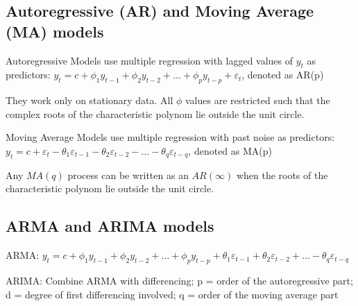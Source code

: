 \subsection{Autoregressive (AR) and Moving Average (MA) models}
Autoregressive Models use multiple regression with lagged values of $ y_t $ as predictors:
$ y_t = c + \phi_1 y_{t-1} + \phi_2 y_{t-2} + \ldots + \phi_p y_{t-p} + \varepsilon_t $, denoted as AR(p)

They work only on stationary data. All $ \phi $ values are restricted such that the complex roots of the characteristic polynom lie outside the unit circle.

Moving Average Models use multiple regression with past noise as predictors:
$ y_t = c + \varepsilon_t - \theta_1 \varepsilon_{t-1} - \theta_2 \varepsilon_{t-2} - \ldots - \theta_q \varepsilon_{t-q} $, denoted as MA(p)

Any $ MA(q) $ process can be written as an $ AR(\infty) $ when the roots of the characteristic polynom lie outside the unit circle.

\subsection{ARMA and ARIMA models}
ARMA: $ y_t = c + \phi_1 y_{t-1} + \phi_2 y_{t-2} + \ldots + \phi_p y_{t-p} + \theta_1 \varepsilon_{t-1} + \theta_2 \varepsilon_{t-2} + \ldots - \theta_q \varepsilon_{t-q} $

ARIMA: Combine ARMA with differencing; p = order of the autoregressive part; d = degree of first differencing involved; q = order of the moving average part
